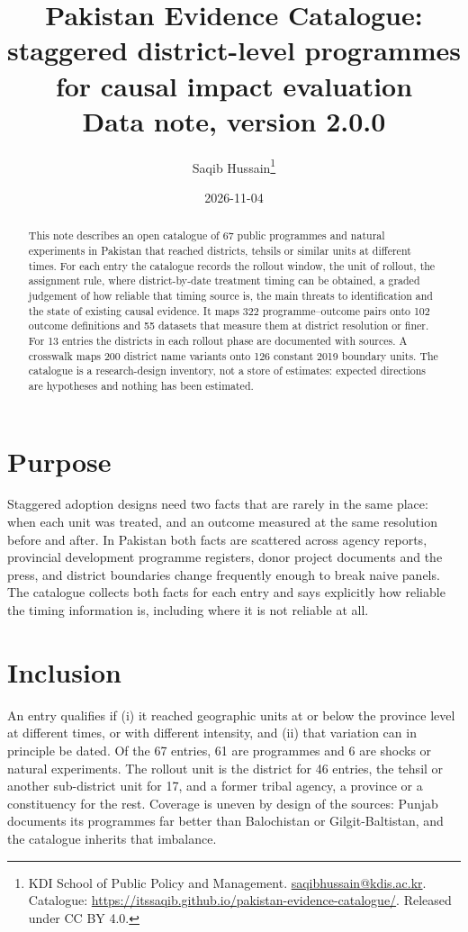 \documentclass[11pt]{article}
\title{Pakistan Evidence Catalogue: staggered district-level programmes\\for causal impact evaluation\\[4pt]\large Data note, version 2.0.0}
\author{Saqib Hussain\thanks{KDI School of Public Policy and Management. \href{mailto:saqibhussain@kdis.ac.kr}{saqibhussain@kdis.ac.kr}. Catalogue: \url{https://itssaqib.github.io/pakistan-evidence-catalogue/}. Released under CC BY 4.0.}}
\date{2026-11-04}
\begin{document}
\maketitle
\begin{abstract}\noindent
This note describes an open catalogue of 67 public programmes and natural experiments in Pakistan that reached districts, tehsils or similar units at different times. For each entry the catalogue records the rollout window, the unit of rollout, the assignment rule, where district-by-date treatment timing can be obtained, a graded judgement of how reliable that timing source is, the main threats to identification and the state of existing causal evidence. It maps 322 programme--outcome pairs onto 102 outcome definitions and 55 datasets that measure them at district resolution or finer. For 13 entries the districts in each rollout phase are documented with sources. A crosswalk maps 200 district name variants onto 126 constant 2019 boundary units. The catalogue is a research-design inventory, not a store of estimates: expected directions are hypotheses and nothing has been estimated.
\end{abstract}

\section{Purpose}
Staggered adoption designs need two facts that are rarely in the same place: when each unit was treated, and an outcome measured at the same resolution before and after. In Pakistan both facts are scattered across agency reports, provincial development programme registers, donor project documents and the press, and district boundaries change frequently enough to break naive panels. The catalogue collects both facts for each entry and says explicitly how reliable the timing information is, including where it is not reliable at all.

\section{Inclusion}
An entry qualifies if (i) it reached geographic units at or below the province level at different times, or with different intensity, and (ii) that variation can in principle be dated. Of the 67 entries, 61 are programmes and 6 are shocks or natural experiments. The rollout unit is the district for 46 entries, the tehsil or another sub-district unit for 17, and a former tribal agency, a province or a constituency for the rest. Coverage is uneven by design of the sources: Punjab documents its programmes far better than Balochistan or Gilgit-Baltistan, and the catalogue inherits that imbalance.
\end{document}
